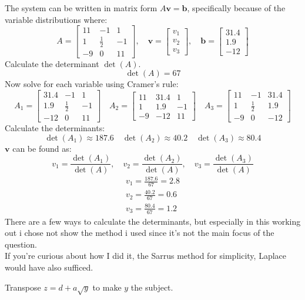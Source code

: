 \documentclass[a4paper, 12pt]{report}
\begin{document}
    The system can be written in matrix form \( A\mathbf{v} = \mathbf{b} \), specifically because of the variable distributions where:
    \[A = \begin{bmatrix} 11 & -1 & 1 \\ 1 & \frac{1}{2} & -1 \\ -9 & 0 & 11 \end{bmatrix}, \quad \mathbf{v} = \begin{bmatrix} v_1 \\ v_2 \\ v_3 \end{bmatrix}, \quad \mathbf{b} = \begin{bmatrix} 31.4 \\ 1.9 \\ -12 \end{bmatrix}\]
    Calculate the determinant \(\det(A)\).
    \[\det(A) = 67\]
    Now solve for each variable using Cramer's rule:
    \[A_1 = \begin{bmatrix} 31.4 & -1 & 1 \\ 1.9 & \frac{1}{2} & -1 \\ -12 & 0 & 11 \end{bmatrix}
    \quad 
    A_2 = \begin{bmatrix} 11 & 31.4 & 1 \\ 1 & 1.9 & -1 \\ -9 & -12 & 11 \end{bmatrix}
    \quad 
    A_3 = \begin{bmatrix} 11 & -1 & 31.4 \\ 1 & \frac{1}{2} & 1.9 \\ -9 & 0 & -12 \end{bmatrix}\]
    Calculate the determinants:
    \[\det(A_1)\approx187.6 \quad \det(A_2)\approx40.2\quad \det(A_3)\approx80.4\]
    \(\mathbf{v}\) can be found as:
    \[v_1 = \frac{\det(A_1)}{\det(A)}, \quad v_2 = \frac{\det(A_2)}{\det(A)}, \quad v_3 = \frac{\det(A_3)}{\det(A)}\]
    \[\boxed{\begin{array}{rcl}v_1=\frac{187.6}{67}=2.8\\[6pt]v_2=\frac{40.2}{67}=0.6\\[6pt]v_3=\frac{80.4}{67}=1.2\end{array}}\]
    There are a few ways to calculate the determinants, but especially in this working out i chose not show the method i used since it’s not the main focus of the question.\\[6pt]
    If you’re curious about how I did it, the Sarrus method for simplicity, Laplace would have also sufficed.
    \newpage    
    \begin{tcolorbox}[title=\color{black}{\section{Q6}}, colback=white, colframe=black!30!white, boxrule=0.4mm, width=1\textwidth]
        Transpose \( z = d + a \sqrt{y} \) to make \( y \) the subject.
    \end{tcolorbox}
\end{document}
